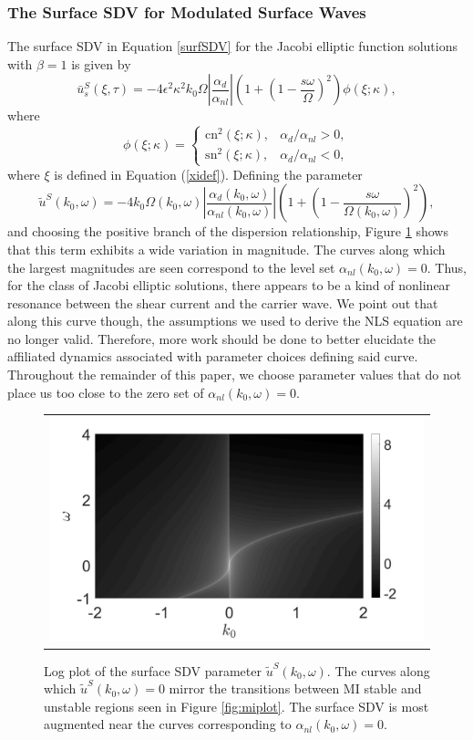 \documentclass{JFM_Style/jfm}
\newcommand{\ba}{\begin{array}}
\newcommand{\ea}{\end{array}}
\begin{document}
\subsubsection*{The Surface SDV for Modulated Surface Waves}
The surface SDV in Equation \eqref{surfSDV} for the Jacobi elliptic function solutions with $\beta=1$ is given by
\[
\bar{u}^{S}_{s}(\xi,\tau) = -4\epsilon^{2}\kappa^{2}k_{0}\Omega \left|\frac{\alpha_{d}}{\alpha_{nl}}\right| \left(1 + \left(1 - \frac{s\omega}{\Omega} \right)^{2} \right)\phi(\xi;\kappa),
\]
where
\[
\phi(\xi;\kappa) = \left\{\ba{rl} \mbox{cn}^2(\xi;\kappa), & \alpha_{d}/\alpha_{nl}>0, \\  \mbox{sn}^2(\xi;\kappa), & \alpha_{d}/\alpha_{nl}<0,\ea \right.
\]
where $\xi$ is defined in Equation (\ref{xidef}).  Defining the parameter
\[
\tilde{u}^{S}(k_{0},\omega) = -4 k_{0}\Omega(k_{0},\omega) \left|\frac{\alpha_{d}(k_{0},\omega)}{\alpha_{nl}(k_{0},\omega)}\right|\left(1 + \left(1 - \frac{s\omega}{\Omega(k_{0},\omega)} \right)^{2} \right),
\]
and choosing the positive branch of the dispersion relationship, Figure \ref{fig:sdriftmag_sign} shows that this term exhibits a wide variation in magnitude.  The curves along which the largest magnitudes are seen correspond to the level set $\alpha_{nl}(k_{0},\omega)=0$.  Thus, for the class of Jacobi elliptic solutions, there appears to be a kind of nonlinear resonance between the shear current and the carrier wave.  We point out that along this curve though, the assumptions we used to derive the NLS equation are no longer valid.  Therefore, more work should be done to better elucidate the affiliated dynamics associated with parameter choices defining said curve.  Throughout the remainder of this paper, we choose parameter values that do not place us too close to the zero set of $\alpha_{nl}(k_{0},\omega)=0$.
\begin{figure}
\centering
\begin{tabular}{c}
\includegraphics[width=.55\textwidth]{us_magnitude}
\end{tabular}
\caption{\small Log plot of the surface SDV parameter $\tilde{u}^{S}(k_{0},\omega)$.  The curves along which $\tilde{u}^{S}(k_{0},\omega)=0$ mirror the transitions between MI stable and unstable regions seen in Figure \ref{fig:miplot}.  The surface SDV is most augmented near the curves corresponding to $\alpha_{nl}(k_{0},\omega)=0$.  }
\label{fig:sdriftmag_sign}
\end{figure}
\end{document}
